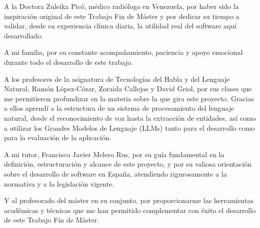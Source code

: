 A la Doctora Zuleika Picó, médico radiólogo en Venezuela, por haber sido la inspiración
original de este Trabajo Fin de Máster y por dedicar su tiempo a validar,
desde su experiencia clínica diaria, la utilidad real del software aquí desarrollado.

A mi familia, por su constante acompañamiento, paciencia y apoyo emocional durante todo
el desarrollo de este trabajo.

A los profesores de la asignatura de Tecnologías del Habla y del Lenguaje Natural, 
Ramón López-Cózar, Zoraida Callejas y David Griol, por sus clases que me 
permitieron profundizar en la materia sobre la que gira este proyecto. Gracias a ellos
aprendí a la estructura de un sistema de procesamiento del lenguaje natural,
desde el reconocimiento de voz hasta la extracción de entidades, así como a utilizar
los Grandes Modelos de Lenguaje (LLMs) tanto para el desarrollo como para la evaluación
de la aplicación.

A mi tutor, Francisco Javier Melero Rus, por su guía fundamental en la definición, 
estructuración y alcance de este proyecto, y por su valiosa orientación sobre el desarrollo
de software en España, atendiendo rigurosamente a la normativa y a la legislación vigente.

Y al profesorado del máster en su conjunto, por proporcionarme las herramientas académicas 
y técnicas que me han permitido complementar con éxito el desarrollo de este Trabajo Fin 
de Máster.